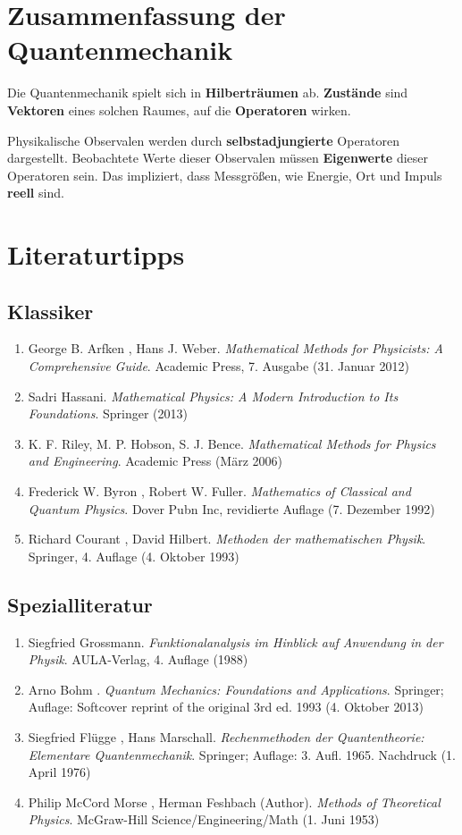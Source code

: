 \documentclass[a4paper,12pt,portrait]{book}
\numberwithin{equation}{section}
\begin{document}
\section{Zusammenfassung der Quantenmechanik}

Die Quantenmechanik spielt sich in \textbf{Hilberträumen} ab. \textbf{Zustände} sind \textbf{Vektoren} eines solchen Raumes, auf die \textbf{Operatoren} wirken.

Physikalische Observalen werden durch \textbf{selbstadjungierte} Operatoren dargestellt. Beobachtete Werte dieser Observalen müssen \textbf{Eigenwerte} dieser Operatoren sein. Das impliziert, dass Messgrößen, wie Energie, Ort und Impuls \textbf{reell} sind.

\section{Literaturtipps}
\subsection{Klassiker}
\begin{enumerate}
	\item George B. Arfken ,  Hans J. Weber. \textit{Mathematical Methods for Physicists: A Comprehensive Guide}.  Academic Press, 7. Ausgabe (31. Januar 2012) 
	\item Sadri Hassani. \textit{Mathematical Physics: A Modern Introduction to Its Foundations}. Springer (2013) 
	\item K. F. Riley, M. P. Hobson, S. J. Bence. \textit{Mathematical Methods for Physics and Engineering}. Academic Press (März 2006)
	\item Frederick W. Byron , Robert W. Fuller. \textit{Mathematics of Classical and Quantum Physics}. Dover Pubn Inc, revidierte Auflage (7. Dezember 1992)
	\item Richard Courant , David Hilbert. \textit{Methoden der mathematischen Physik}. Springer, 4. Auflage (4. Oktober 1993)
\end{enumerate}

\subsection{Spezialliteratur}
\begin{enumerate}
	\item Siegfried Grossmann. \textit{Funktionalanalysis im Hinblick auf Anwendung in der Physik}. AULA-Verlag, 4. Auflage (1988)
	\item Arno Bohm . \textit{Quantum Mechanics: Foundations and Applications}. Springer; Auflage: Softcover reprint of the original 3rd ed. 1993 (4. Oktober 2013)
	\item Siegfried Flügge , Hans Marschall. \textit{Rechenmethoden der Quantentheorie: Elementare Quantenmechanik}. Springer; Auflage: 3. Aufl. 1965. Nachdruck (1. April 1976)
	\item Philip McCord Morse , Herman Feshbach (Author). \textit{Methods of Theoretical Physics}. McGraw-Hill Science/Engineering/Math (1. Juni 1953)
\end{enumerate}
\end{document}

